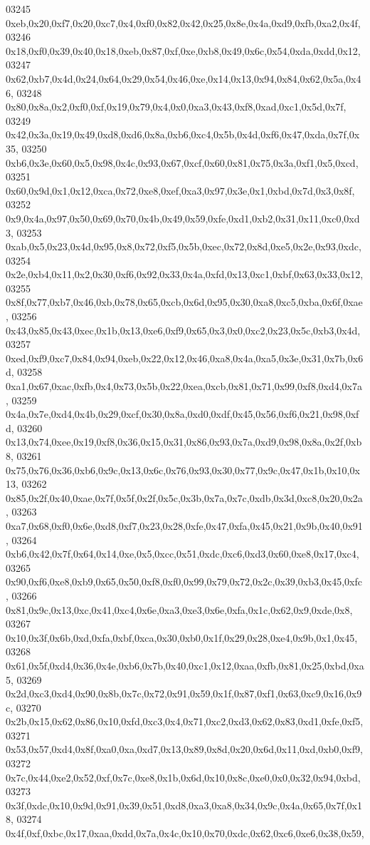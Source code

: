 \begin{DoxyCode}
03245   0xeb,0x20,0xf7,0x20,0xc7,0x4,0xf0,0x82,0x42,0x25,0x8e,0x4a,0xd9,0xfb,0xa2,0x4f,
03246   0x18,0xf0,0x39,0x40,0x18,0xeb,0x87,0xf,0xe,0xb8,0x49,0x6c,0x54,0xda,0xdd,0x12,
03247   0x62,0xb7,0x4d,0x24,0x64,0x29,0x54,0x46,0xe,0x14,0x13,0x94,0x84,0x62,0x5a,0x46,
03248   0x80,0x8a,0x2,0xf0,0xf,0x19,0x79,0x4,0x0,0xa3,0x43,0xf8,0xad,0xc1,0x5d,0x7f,
03249   0x42,0x3a,0x19,0x49,0xd8,0xd6,0x8a,0xb6,0xc4,0x5b,0x4d,0xf6,0x47,0xda,0x7f,0x35,
03250   0xb6,0x3e,0x60,0x5,0x98,0x4c,0x93,0x67,0xcf,0x60,0x81,0x75,0x3a,0xf1,0x5,0xcd,
03251   0x60,0x9d,0x1,0x12,0xca,0x72,0xe8,0xef,0xa3,0x97,0x3e,0x1,0xbd,0x7d,0x3,0x8f,
03252   0x9,0x4a,0x97,0x50,0x69,0x70,0x4b,0x49,0x59,0xfe,0xd1,0xb2,0x31,0x11,0xc0,0xd3,
03253   0xab,0x5,0x23,0x4d,0x95,0x8,0x72,0xf5,0x5b,0xec,0x72,0x8d,0xe5,0x2e,0x93,0xdc,
03254   0x2e,0xb4,0x11,0x2,0x30,0xf6,0x92,0x33,0x4a,0xfd,0x13,0xc1,0xbf,0x63,0x33,0x12,
03255   0x8f,0x77,0xb7,0x46,0xb,0x78,0x65,0xcb,0x6d,0x95,0x30,0xa8,0xc5,0xba,0x6f,0xae,
03256   0x43,0x85,0x43,0xec,0x1b,0x13,0xe6,0xf9,0x65,0x3,0x0,0xc2,0x23,0x5c,0xb3,0x4d,
03257   0xed,0xf9,0xc7,0x84,0x94,0xeb,0x22,0x12,0x46,0xa8,0x4a,0xa5,0x3e,0x31,0x7b,0x6d,
03258   0xa1,0x67,0xac,0xfb,0x4,0x73,0x5b,0x22,0xea,0xcb,0x81,0x71,0x99,0xf8,0xd4,0x7a,
03259   0x4a,0x7e,0xd4,0x4b,0x29,0xcf,0x30,0x8a,0xd0,0xdf,0x45,0x56,0xf6,0x21,0x98,0xfd,
03260   0x13,0x74,0xee,0x19,0xf8,0x36,0x15,0x31,0x86,0x93,0x7a,0xd9,0x98,0x8a,0x2f,0xb8,
03261   0x75,0x76,0x36,0xb6,0x9c,0x13,0x6c,0x76,0x93,0x30,0x77,0x9c,0x47,0x1b,0x10,0x13,
03262   0x85,0x2f,0x40,0xae,0x7f,0x5f,0x2f,0x5c,0x3b,0x7a,0x7c,0xdb,0x3d,0xc8,0x20,0x2a,
03263   0xa7,0x68,0xf0,0x6e,0xd8,0xf7,0x23,0x28,0xfe,0x47,0xfa,0x45,0x21,0x9b,0x40,0x91,
03264   0xb6,0x42,0x7f,0x64,0x14,0xe,0x5,0xcc,0x51,0xdc,0xc6,0xd3,0x60,0xe8,0x17,0xc4,
03265   0x90,0xf6,0xe8,0xb9,0x65,0x50,0xf8,0xf0,0x99,0x79,0x72,0x2c,0x39,0xb3,0x45,0xfc,
03266   0x81,0x9c,0x13,0xc,0x41,0xc4,0x6e,0xa3,0xe3,0x6e,0xfa,0x1c,0x62,0x9,0xde,0x8,
03267   0x10,0x3f,0x6b,0xd,0xfa,0xbf,0xca,0x30,0xb0,0x1f,0x29,0x28,0xe4,0x9b,0x1,0x45,
03268   0x61,0x5f,0xd4,0x36,0x4e,0xb6,0x7b,0x40,0xc1,0x12,0xaa,0xfb,0x81,0x25,0xbd,0xa5,
03269   0x2d,0xc3,0xd4,0x90,0x8b,0x7c,0x72,0x91,0x59,0x1f,0x87,0xf1,0x63,0xc9,0x16,0x9c,
03270   0x2b,0x15,0x62,0x86,0x10,0xfd,0xc3,0x4,0x71,0xc2,0xd3,0x62,0x83,0xd1,0xfe,0xf5,
03271   0x53,0x57,0xd4,0x8f,0xa0,0xa,0xd7,0x13,0x89,0x8d,0x20,0x6d,0x11,0xd,0xb0,0xf9,
03272   0x7c,0x44,0xe2,0x52,0xf,0x7c,0xe8,0x1b,0x6d,0x10,0x8c,0xe0,0x0,0x32,0x94,0xbd,
03273   0x3f,0xdc,0x10,0x9d,0x91,0x39,0x51,0xd8,0xa3,0xa8,0x34,0x9c,0x4a,0x65,0x7f,0x18,
03274   0x4f,0xf,0xbc,0x17,0xaa,0xdd,0x7a,0x4c,0x10,0x70,0xdc,0x62,0xc6,0xe6,0x38,0x59,

\end{DoxyCode}
